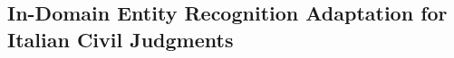 \subsection{In-Domain Entity Recognition Adaptation for Italian Civil Judgments}
\label{sec:adaptation}




